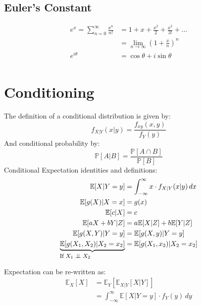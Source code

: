 \subsection{Euler's Constant}
\begin{equation*}
    \begin{aligned}
        e^x = \sum_{n=0}^{\infty} \frac{x^n}{n!} &= 1 + x + \frac{x^2}{2} +
        \frac{x^3}{3!} + \dots \\
            &= \lim_{n\to\infty} \left(1 + \frac{x}{n} \right)^n \\
        e^{i\theta} &= \cos\theta + i\sin\theta \\
    \end{aligned}
\end{equation*}

\section{Conditioning}
The definition of a conditional distribution is given by:
\begin{equation*}
    f_{X|Y}(x|y) = \frac{f_{xy}(x, y)}{f_Y(y)}
\end{equation*}
And conditional probability by:
\begin{equation*}
    \mathbb{P}[A|B] = \frac{ \mathbb{P}[A \cap B]}{ \mathbb{P}[B] }
\end{equation*}
Conditional Expectation identities and definitions:
\begin{equation*}
    \begin{aligned}
        \mathbb{E}[X|Y=y] &= \int_{-\infty}^{\infty} x \cdot f_{X|Y}(x|y) \,dx \\
        \mathbb{E}[g(X)|X=x] &= g(x) \\
        \mathbb{E}[c | X] &= c \\
        \mathbb{E}[aX + bY | Z] &= a \mathbb{E}[X|Z] + b \mathbb{E}[Y|Z] \\
        \mathbb{E}[g(X, Y) | Y=y] &= \mathbb{E}[g(X, y) | Y=y] \\
        \explain{\mathbb{E}[g(X_1, X_2) | X_2=x_2]}{If $X_1 \indep X_2$} &= \mathbb{E}[g(X_1, x_2) | X_2=x_2] \\
    \end{aligned}
\end{equation*}

Expectation can be re-written as:
\begin{equation*}
    \begin{aligned}
        \mathbb{E}_X[X] &= \mathbb{E}_Y[ \mathbb{E}_{X|Y}[X|Y] ] \\
            &= \int_{-\infty}^{\infty} \mathbb{E}[X|Y=y] \cdot f_Y(y) \,dy \\
    \end{aligned}
\end{equation*}

